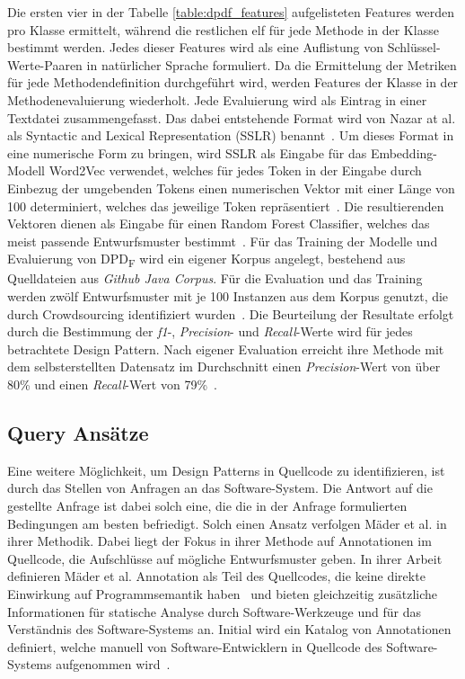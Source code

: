 Die ersten vier in der Tabelle \ref{table:dpdf_features} aufgelisteten Features werden pro Klasse ermittelt, während die restlichen elf für jede Methode in der Klasse bestimmt werden.
Jedes dieser Features wird als eine Auflistung von Schlüssel-Werte-Paaren in natürlicher Sprache formuliert.
Da die Ermittelung der Metriken für jede Methodendefinition durchgeführt wird, werden Features der Klasse in der Methodenevaluierung wiederholt.
Jede Evaluierung wird als Eintrag in einer Textdatei zusammengefasst. Das dabei entstehende Format wird von Nazar at al. als Syntactic and Lexical Representation (SSLR) benannt~\cite[S. 1]{Nazar2020}.
Um dieses Format in eine numerische Form zu bringen, wird SSLR als Eingabe für das Embedding-Modell Word2Vec verwendet, welches für jedes Token in der Eingabe durch Einbezug der umgebenden Tokens einen numerischen Vektor mit einer Länge von 100 determiniert, welches das jeweilige Token repräsentiert~\cite[S. 6]{Nazar2020}.
Die resultierenden Vektoren dienen als Eingabe für einen Random Forest Classifier, welches das meist passende Entwurfsmuster bestimmt~\cite[S. 7]{Nazar2020}.
Für das Training der Modelle und Evaluierung von DPD\textsubscript{F} wird ein eigener Korpus angelegt, bestehend aus Quelldateien aus \textit{Github Java Corpus}. Für die Evaluation und das Training werden zwölf Entwurfsmuster mit je 100 Instanzen aus dem Korpus genutzt, die durch Crowdsourcing identifiziert wurden~\cite[S. 4]{Nazar2020}.
Die Beurteilung der Resultate erfolgt durch die Bestimmung der \textit{f1}-, \textit{Precision}- und \textit{Recall}-Werte wird für jedes betrachtete Design Pattern. Nach eigener Evaluation erreicht ihre Methode mit dem selbsterstellten Datensatz im Durchschnitt einen \textit{Precision}-Wert von über 80\% und einen \textit{Recall}-Wert von 79\%~\cite[S. 8]{Nazar2020}.


\subsection{Query Ansätze}

Eine weitere Möglichkeit, um Design Patterns in Quellcode zu identifizieren, ist durch das Stellen von Anfragen an das Software-System.
Die Antwort auf die gestellte Anfrage ist dabei solch eine, die die in der Anfrage formulierten Bedingungen am besten befriedigt.
Solch einen Ansatz verfolgen Mäder et al. in ihrer Methodik. Dabei liegt der Fokus in ihrer Methode auf Annotationen im Quellcode,
die Aufschlüsse auf mögliche Entwurfsmuster geben. In ihrer Arbeit definieren Mäder et al. Annotation als Teil des Quellcodes, die keine direkte Einwirkung auf Programmsemantik haben~\cite[S. 521]{Ghula-2010} und bieten gleichzeitig zusätzliche Informationen für statische Analyse durch Software-Werkzeuge und für das Verständnis des Software-Systems an.
Initial wird ein Katalog von Annotationen definiert, welche manuell von Software-Entwicklern in Quellcode des Software-Systems aufgenommen wird~\cite[S. 521]{Ghula-2010}.

